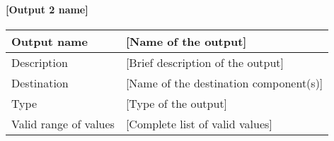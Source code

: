 \paragraph{[Output 2 name]}

\begin{longtable}{p{}p{}}
\toprule
Output name				& [Name of the output] \\
\midrule
Description				& [Brief description of the output] \\
\midrule
Destination				& [Name of the destination component(s)] \\ 
\midrule
Type						& [Type of the output] \\
\midrule
Valid range of values	& [Complete list of valid values] \\
\bottomrule
\end{longtable}
